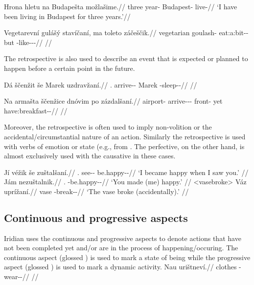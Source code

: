 \pex
\begingl
\gla Hrona hletu na Budapešta možlašime.//
\glb three year-\Ins{} \Loc{} Budapest-\Acc{} live-//
\glft `I have been living in Budapest for three years.'//
\endgl
\xe

\pex
\begingl
\gla Vegetarevní gulášý stavíčaní, ma toleto záčeščik.//
\glb vegetarian goulash-\Gen{} eat:a:bit-\Av{}-\Ret{} but \Aff{} \Neg{}-like-\Av{}-\Pf{}-\Quot{}//
\glft {} //
\endgl
\xe

The retrospective is also used to describe an event that is expected or planned
to happen before a certain point in the future.

\pex
\begingl
\gla Dá ščenžit še Marek uzdravžaní.//
\glb \First{}\Sg{}.\Str{} arrive-\Av{}-\SupP{} \Com{} Marek \Refl{}-sleep-\Av{}-\Ret{}//
\glft {} //
\endgl
\xe

\pex
\begingl
\gla Na armašta ščenžice dnóvim po zázdalšaní.//
\glb \Loc{} airport-\Acc{} arrive-\Av{}-\SupP{}-\Att{} front-\Ins{} yet have:breakfast-\Av{}-\Ret{}//
\glft {} //
\endgl
\xe

Moreover, the retrospective is often used to imply non-volition or the
accidental/circumstantial nature of an action. Similarly the retrospective is
used with verbs of emotion or state (e.g.,  from
. The perfective, on the other hand, is almost exclusively
used with the causative in these cases.

\pex
\a	\begingl
\gla Jí véžik še zuštalšaní.//
\glb \Second{}\Sg{}.\Acc{} see-\Av{}-\Pf{} \Com{} be.happy-\Av{}-\Ret{}//
\glft `I became happy when I saw you.' //
\endgl
\a	\begingl
\gla Jám nezuštalnik.//
\glb \Second{}\Sg{}.\Agt{} \Caus{}-be.happy-\Pv{}-\Pf{}//
\glft `You made (me) happy.' //
\endgl
\xe
\pex<vasebroke>
\begingl
\gla Váz uprížaní.//
\glb vase \Refl{}-break-\Av{}-\Pf{}//
\glft `The vase broke (accidentally).' //
\endgl
\xe

\subsection{Continuous and progressive aspects}
Iridian uses the continuous and progressive aspects to denote actions that have
not been completed yet and/or are in the process of happening/occuring. The
continuous aspect (glossed \Cont{}) is used to mark a state of being while the
progressive aspect (glossed \Prog{}) is used to mark a dynamic activity.
\pex
\begingl
\gla Nau urištneví.//
\glb clothes \Refl{}-wear-\Pv{}-\Cont{}//
\glft {} //
\endgl
\xe

